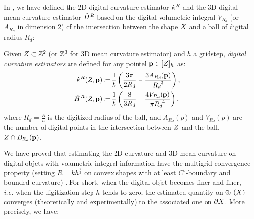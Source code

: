 \documentclass{llncs}
\newcommand{\ie}{\emph{i.e.} }
\begin{document}
In \cite{DGCI2013}, we have defined the 2D digital curvature estimator
$\hat{\kappa}^{R}$ and the 3D digital mean curvature estimator $\hat{H}^{R}$ based on
the digital volumetric integral $V_{R_d}$ (or $A_{R_d}$ in dimension 2) of the
intersection between the shape $X$ and a ball of digital radius $R_d$:

\begin{Definition}
  Given $Z \subset {\mathbb{Z}}^2$ (or ${\mathbb{Z}}^3$ for 3D mean curvature estimator) and
  $h$ a gridstep, {\em digital curvature estimators} are defined for any pointel
  $\mathbf{p} \in \lbrack Z \rbrack_{h}$ as:
  \begin{align}
   \hat{\kappa}^{R}(Z,\mathbf{p}) &\!\mathrel{\mathop:}=\! \frac{1}{h} \left( \frac{3 \pi}{2 R_d} - \frac{3 A_{R_d}(\mathbf{p})}{{R_d}^3} \right),\label{eq:dig-curvature-estimator-k}\\
   \hat{H}^{R}(Z,\mathbf{p}) &\!\mathrel{\mathop:}=\! \frac{1}{h} \left( \frac{8}{3 R_d} - \frac{4V_{R_d}(\mathbf{p})}{{\pi R_d}^4} \right),\label{eq:dig-curvature-estimator-H}
  \end{align}
  where $R_d = \frac{R}{h}$ is the digitized radius of the ball, and
  $A_{R_d}(p)$ and $V_{R_d}(p)$ are the number of digital points in the
  intersection between $Z$ and the ball, $Z\cap B_{R_d}(\mathbf{p})$.
\end{Definition}

We have proved that estimating the 2D curvature and 3D mean curvature on digital
objets with volumetric integral information have the multigrid convergence
property (setting $R = kh^\frac{1}{3}$ on convex shapes with at least
$C^3$-boundary and bounded curvature) \cite{CVIU2014}. For short, when the digital objet becomes
finer and finer, \ie when the digitization step $h$ tends to zero, the estimated
quantity on $\mathtt{G}_{h}\left(X\right)$  converges (theoretically and experimentally) to
the associated one on $\partial X$. More precisely, we have:
\end{document}

